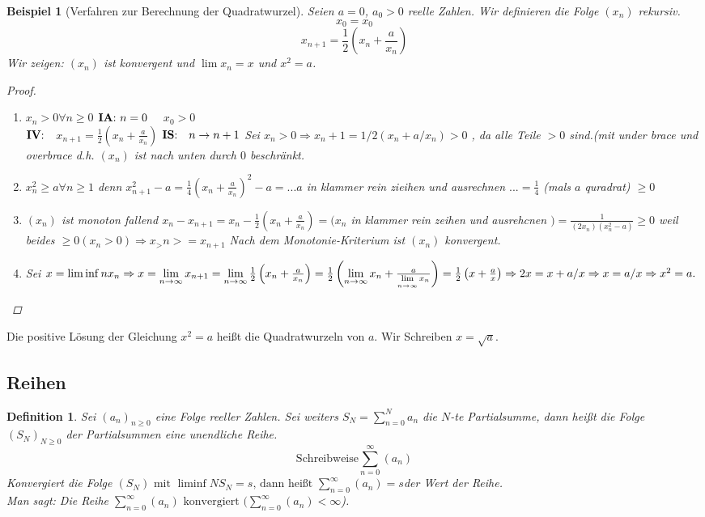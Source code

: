 \documentclass[a4paper,titlepage,oneside]{article}
\newcommand{\IA}[1]{\ensuremath{\text{\textbf{IA}: }#1\quad}}
\newcommand{\IV}{\ensuremath{\text{\textbf{IV}:}\quad}}
\newcommand{\IS}[1]{\ensuremath{\text{\textbf{IS}:}\quad #1\newline}}
\newcommand{\suminf}[2]{\ensuremath{\sum_{#1= 0}^{\infty}{\left(#2\right)}}}
\def\toinf{\ensuremath{\rightarrow \infty}}
\theoremstyle{thmstyle}
\newtheorem{defi}[satz]{Definition}
\newtheorem{bsp}[satz]{Beispiel}
\begin{document}
\begin{bsp}[Verfahren zur Berechnung der Quadratwurzel]
Seien $a = 0$, $a_0 > 0$ reelle Zahlen. Wir definieren die Folge $(x_n)$ rekursiv.\\
\[x_0 = x_0\]
\[x_{n+1} =  \frac{1}{2}\left(x_n + \frac{a}{x_n}\right) \]
Wir zeigen: $(x_n)$ ist konvergent und $\lim{x_n} = x$ und $x^2 = a$.
\begin{proof}
\begin{enumerate}
\item $x_n > 0 \forall n \ge 0$
\IA{n=0} $x_0 > 0$ \\
\IV \(x_{n+1} =  \frac{1}{2}\left(x_n + \frac{a}{x_n}\right)\)
\IS{n \to n+1}
Sei $x_n > 0 \Rightarrow x_n+1 = 1/2 (x_n + a/x_n) > 0$ , da alle Teile $> 0$ sind.(mit under brace und overbrace
d.h. $(x_n)$ ist nach unten durch $0$ beschränkt.
\item $x_n^2 \ge a \forall n \ge 1$
denn $x_{n+1}^2 - a = \frac{1}{4}\left(x_n + \frac{a}{x_n}\right)^2  - a = ... a$ in klammer rein zieihen und ausrechnen $... = \frac{1}{4}$ (mals  $a$ quradrat) $\ge 0$
\item $(x_n)$ ist monoton fallend
$x_n - x_{n+1} = x_n - \frac{1}{2} \left(x_n + \frac{a}{x_n}\right) = (x_n$ in klammer rein zeihen und ausrehcnen $) = \frac{1}{(2x_n)(x_n^2 - a)} \ge 0 $ weil beides $\ge 0 (x_n > 0)
\Rightarrow x_>n >= x_{n+1}$
Nach dem Monotonie-Kriterium ist $(x_n)$ konvergent.
\item Sei $x= \liminf{n}{x_n} \Rightarrow x = \lim\limits_{n \toinf}{x_{n+1}} = \lim\limits_{n \toinf}{\frac{1}{2}\left(x_n + \frac{a}{x_n}\right)} = \frac{1}{2}\left(\lim\limits_{n \toinf}x_n + \frac{a}{\lim\limits_{n \toinf}x_n}\right) =  \frac{1}{2}\left(x + \frac{a}{x}\right) \Rightarrow 2x = x + a/x \Rightarrow \\
x = a/x \Rightarrow x^2 = a.$
\end{enumerate}
\end{proof}
\end{bsp}
Die positive Lösung der Gleichung $x^2 = a$ heißt die Quadratwurzeln von $a$. Wir Schreiben $x = \sqrt{a}$.

\subsection{Reihen}

\begin{defi}
Sei $(a_n)_{n\ge0}$ eine Folge reeller Zahlen. Sei weiters $S_N = \sum_{n = 0}^{N}{a_n}$ die $N$-te Partialsumme, dann heißt die Folge $(S_N)_{N \ge 0}$ der Partialsummen eine unendliche Reihe.\\
\[\text{Schreibweise}\suminf{n}{a_n}\]
Konvergiert die Folge \((S_N)\text{ mit }\liminf{N}{S_N} = s \text{, dann heißt } \suminf{n}{a_n} = s\)der Wert der Reihe.\\
Man sagt: Die Reihe \(\suminf{n}{a_n}\text{ konvergiert (}\suminf{n}{a_n} < \infty\)).
\end{defi}
\end{document}
